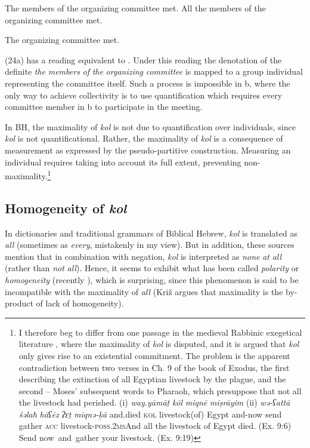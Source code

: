 \documentclass[output=paper]{langsci/langscibook}
\begin{document}
\ea%
    \label{ex:doron:24}
    \ea The members of the organizing committee met.
    \ex All the members of the organizing committee met.
    \z
\z


\ea%
    \label{ex:doron:25}
    The organizing committee met.
\z 

(24a) has a reading equivalent to . Under this reading the denotation of the definite \textit{the} \textit{members} \textit{of} \textit{the} \textit{organizing} \textit{committee} is mapped to a group individual representing the committee itself. Such a process is impossible in b, where the only way to achieve collectivity is to use quantification which requires every committee member in b to participate in the meeting. 

In BH, the maximality of \textit{kol} is not due to quantification over individuals, since \textit{kol} is not quantificational. Rather, the maximality of \textit{kol} is a consequence of measurement as expressed by the pseudo-partitive construction. Measuring an individual requires taking into account its full extent, preventing non-maximality.\footnote{I therefore beg to differ from one passage in the medieval Rabbinic exegetical literature \citep[245]{Assaf1929}, where the maximality of \textit{kol} is disputed, and it is argued that \textit{kol} only gives rise to an existential commitment. The problem is the apparent contradiction between two verses in Ch. 9 of the book of Exodus, the first describing the extinction of all Egyptian livestock by the plague, and the second – Moses’ subsequent words to Pharaoh, which presuppose that not all the livestock had perished.  (i)  \textit{way.yāmāṯ}  \textit{kōl}   \textit{miqnē}            \textit{miṣrāyim}      (ii)  \textit{wə-ʕattā}  \textit{šəlaħ}  \textit{hāʕēz} \textit{ʔɛṯ}    \textit{miqnə-ḵā}  and.died      \textsc{kol} livestock(of) Egypt    and-now  send  gather \textsc{acc} livestock-\textsc{poss.2ms}\textrm{And all the livestock of Egypt died.   (}Ex. 9:6) \textrm{Send now~and~gather your livestock.} (Ex. 9:19)} 

\subsection{Homogeneity of \textit{kol}}%

In dictionaries and traditional grammars of Biblical Hebrew, \textit{kol} is translated as \textit{all} (sometimes as \textit{every}, mistakenly in my view). But in addition, these sources mention that in combination with negation, \textit{kol} is interpreted as \textit{none} \textit{at} \textit{all} (rather than \textit{not} \textit{all}). Hence, it seems to exhibit what has been called \textit{polarity} \citep{Löbner2000} or \textit{homogeneity} (recently \citet{Križ2016}), which is surprising, since this phenomenon is said to be incompatible with the maximality of \textit{all} (Križ argues that maximality is the by-product of lack of homogeneity).
\end{document}
